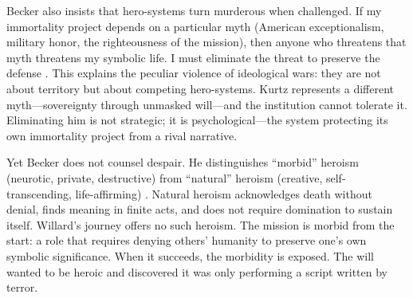 Becker also insists that hero-systems turn murderous when challenged. If my immortality
project depends on a particular myth (American exceptionalism, military honor, the righteousness
of the mission), then anyone who threatens that myth threatens my symbolic life. I must
eliminate the threat to preserve the defense \parencite[pp.~123--125]{BeckerDenial1973}. This
explains the peculiar violence of ideological wars: they are not about territory but about
competing hero-systems. Kurtz represents a different myth---sovereignty through unmasked
will---and the institution cannot tolerate it. Eliminating him is not strategic; it is
psychological---the system protecting its own immortality project from a rival narrative.

Yet Becker does not counsel despair. He distinguishes ``morbid'' heroism (neurotic, private,
destructive) from ``natural'' heroism (creative, self-transcending, life-affirming)
\parencite[pp.~153--175]{BeckerDenial1973}. Natural heroism acknowledges death without denial,
finds meaning in finite acts, and does not require domination to sustain itself. Willard's
journey offers no such heroism. The mission is morbid from the start: a role that requires
denying others' humanity to preserve one's own symbolic significance. When it succeeds, the
morbidity is exposed. The will wanted to be heroic and discovered it was only performing a
script written by terror.
